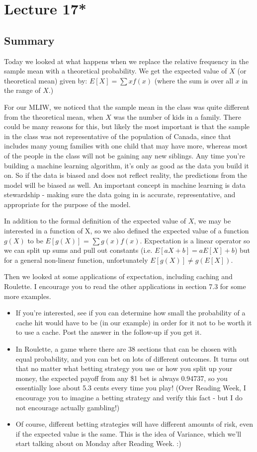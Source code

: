 \section{Lecture 17*}
\subsection{Summary}
Today we looked at what happens when we replace the relative frequency in the sample mean with a theoretical probability. We get the expected value of $X$ (or theoretical mean) given by: $E[X] = \sum x f(x)$ (where the sum is over all $x$ in the range of $X$.) 

For our MLIW, we noticed that the sample mean in the class was quite different from the theoretical mean, when $X$ was the number of kids in a family. There could be many reasons for this, but likely the most important is that the sample in the class was not representative of the population of Canada, since that includes many young families with one child that may have more, whereas most of the people in the class will not be gaining any new siblings. Any time you're building a machine learning algorithm, it's only as good as the data you build it on. So if the data is biased and does not reflect reality, the predictions from the model will be biased as well. An important concept in machine learning is data stewardship - making sure the data going in is accurate, representative, and appropriate for the purpose of the model.

In addition to the formal definition of the expected value of $X$, we may be interested in a function of X, so we also defined the expected value of a function $g(X)$ to be $E[g(X)]$ = $\sum g(x) f(x)$. Expectation is a linear operator so we can split up sums and pull out constants (i.e. $E[aX+b] = aE[X] + b$) but for a general non-linear function, unfortunately $E[g(X)]\neq g(E[X])$.

Then we looked at some applications of expectation, including caching and Roulette. I encourage you to read the other applications in section 7.3 for some more examples.
\begin{itemize}
    \item If you're interested, see if you can determine how small the probability of a cache hit would have to be (in our example) in order for it not to be worth it to use a cache. Post the answer in the follow-up if you get it.
    \item In Roulette, a game where there are 38 sections that can be chosen with equal probability, and you can bet on lots of different outcomes. It turns out that no matter what betting strategy you use or how you split up your money, the expected payoff from any \$1 bet is always 0.94737, so you essentially lose about 5.3 cents every time you play! (Over Reading Week, I encourage you to imagine a betting strategy and verify this fact - but I do not encourage actually gambling!)
    \item Of course, different betting strategies will have different amounts of risk, even if the expected value is the same. This is the idea of Variance, which we'll start talking about on Monday after Reading Week. :)
\end{itemize}


